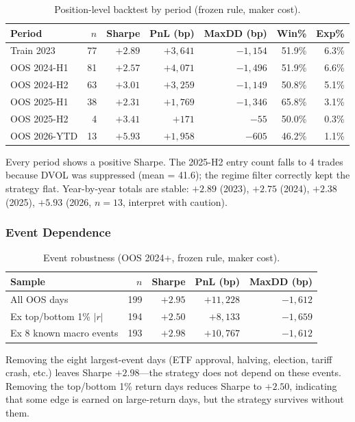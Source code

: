 \documentclass[12pt, a4paper]{article}
\theoremstyle{definition}
\begin{document}
\begin{table}[H]
\centering
\caption{Position-level backtest by period (frozen rule, maker cost).}
\label{tab:backtest_periods}
\begin{tabular}{lrrrrrr}
\hline
Period & $n$ & Sharpe & PnL (bp) & MaxDD (bp) & Win\% & Exp\% \\
\hline
Train 2023   &  77 & $+2.89$ & $+3{,}641$ & $-1{,}154$ & 51.9\% & 6.3\% \\
OOS 2024-H1  &  81 & $+2.57$ & $+4{,}071$ & $-1{,}496$ & 51.9\% & 6.6\% \\
OOS 2024-H2  &  63 & $+3.01$ & $+3{,}259$ & $-1{,}149$ & 50.8\% & 5.1\% \\
OOS 2025-H1  &  38 & $+2.31$ & $+1{,}769$ & $-1{,}346$ & 65.8\% & 3.1\% \\
OOS 2025-H2  &   4 & $+3.41$ &   $+171$   &    $-55$   & 50.0\% & 0.3\% \\
OOS 2026-YTD &  13 & $+5.93$ & $+1{,}958$ &   $-605$   & 46.2\% & 1.1\% \\
\hline
\end{tabular}
\end{table}

Every period shows a positive Sharpe.  The 2025-H2 entry count falls to 4
trades because DVOL was suppressed (mean = 41.6); the regime filter
correctly kept the strategy flat.  Year-by-year totals are stable:
$+2.89$ (2023), $+2.75$ (2024), $+2.38$ (2025), $+5.93$ (2026,
$n = 13$, interpret with caution).

\subsubsection*{Event Dependence}

\begin{table}[H]
\centering
\caption{Event robustness (OOS 2024+, frozen rule, maker cost).}
\label{tab:backtest_events}
\begin{tabular}{lrrrr}
\hline
Sample & $n$ & Sharpe & PnL (bp) & MaxDD (bp) \\
\hline
All OOS days               & 199 & $+2.95$ & $+11{,}228$ & $-1{,}612$ \\
Ex top/bottom 1\% $|r|$   & 194 & $+2.50$ & $+8{,}133$  & $-1{,}659$ \\
Ex 8 known macro events    & 193 & $+2.98$ & $+10{,}767$ & $-1{,}612$ \\
\hline
\end{tabular}
\end{table}

Removing the eight largest-event days (ETF approval, halving, election,
tariff crash, etc.) leaves Sharpe $+2.98$---the strategy does not depend
on these events.  Removing the top/bottom 1\% return days reduces Sharpe
to $+2.50$, indicating that some edge is earned on large-return days, but
the strategy survives without them.
\end{document}
